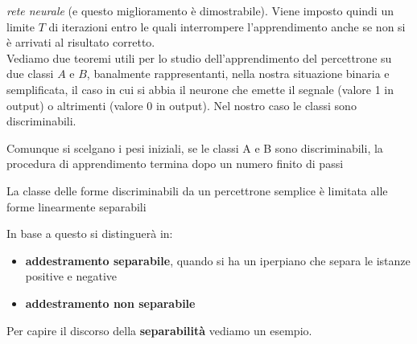 \documentclass[a4paper,12pt, oneside]{book}
\begin{document}
\textit{rete neurale} (e questo miglioramento è dimostrabile). Viene imposto
quindi un limite $T$ di iterazioni entro le 
quali interrompere l'apprendimento anche se non si è arrivati al risultato
corretto.\\
Vediamo due teoremi utili per lo studio dell'apprendimento del percettrone su
due classi $A$ e $B$, banalmente rappresentanti, nella nostra situazione binaria
e semplificata, il caso in cui si abbia il
neurone che emette il segnale (valore 1 in output) o altrimenti (valore 0 in
output). Nel nostro caso le classi sono discriminabili.
\begin{teorema}
  Comunque si scelgano i pesi iniziali, se le classi A e B sono discriminabili,
  la procedura di apprendimento termina dopo un numero finito di passi
\end{teorema}
\begin{teorema}
  La classe delle forme discriminabili da un percettrone semplice è
  limitata alle forme linearmente separabili
\end{teorema}
In base a questo si distinguerà in:
\begin{itemize}
  \item \textbf{addestramento separabile}, quando si ha un iperpiano che separa
  le istanze positive e negative
  \item \textbf{addestramento non separabile}
\end{itemize}
Per capire il discorso della \textbf{separabilità} vediamo un esempio.
\end{document}
